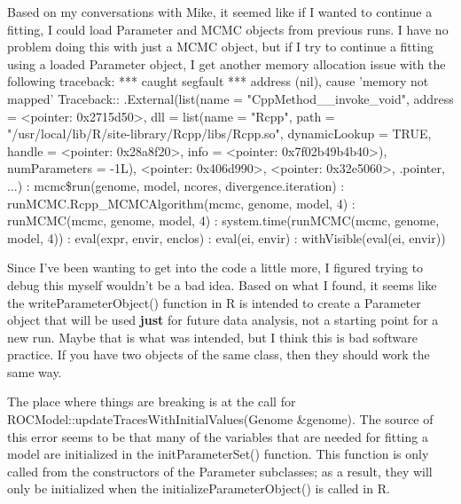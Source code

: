 \documentclass[11pt]{labbook}
\begin{document}
Based on my conversations with Mike, it seemed like if I wanted to continue a fitting, I could load Parameter and MCMC objects from previous runs. I have no problem doing this with just a MCMC object, but if I try to continue a fitting using a loaded Parameter object, I get another memory allocation issue with the following traceback:
\newline
 *** caught segfault ***
address (nil), cause 'memory not mapped'
\newline
Traceback:: .External(list(name = "CppMethod\_\_invoke\_void", address = <pointer: 0x2715d50>,     dll = list(name = "Rcpp", path = "/usr/local/lib/R/site-library/Rcpp/libs/Rcpp.so",         dynamicLookup = TRUE, handle = <pointer: 0x28a8f20>,         info = <pointer: 0x7f02b49b4b40>), numParameters = -1L),     <pointer: 0x406d990>, <pointer: 0x32e5060>, .pointer, ...)
: mcmc\$run(genome, model, ncores, divergence.iteration)
: runMCMC.Rcpp\_MCMCAlgorithm(mcmc, genome, model, 4)
: runMCMC(mcmc, genome, model, 4)
: system.time(runMCMC(mcmc, genome, model, 4))
: eval(expr, envir, enclos)
: eval(ei, envir)
: withVisible(eval(ei, envir))
\newline

Since I've been wanting to get into the code a little more, I figured trying to debug this myself wouldn't be a bad idea. Based on what I found, it seems like the writeParameterObject() function in R is intended to create a Parameter object that will be used \textbf{just} for future data analysis, not a starting point for a new run. Maybe that is what was intended, but I think this is bad software practice. If you have two objects of the same class, then they should work the same way.

The place where things are breaking is at the call for ROCModel::updateTracesWithInitialValues(Genome \&genome). The source of this error seems to be that many of the variables that are needed for fitting a model are initialized in the initParameterSet() function. This function is only called from the constructors of the Parameter subclasses; as a result, they will only be initialized when the initializeParameterObject() is called in R. 
\end{document}
